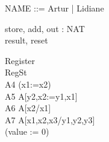 \documentclass{llncs}
\begin{document}
\begin{zed}NAME ::= Artur | Lidiane\end{zed}
\begin{circus}
\circchannel store, add, out : NAT\\
\circchannel result, reset\\
\end{circus}
\begin{circus}
\circprocess Register \circdef\\
\circbegin \circstate RegSt \\
A4 \circdef (x1:=x2)\\
A5 \circdef A[y2,x2:=y1,x1]\\
A6 \circdef A[x2/x1]\\
A7 \circdef A[x1,x2,x3/y1,y2,y3]\\
\circspot (value := 0) \\
\circend\\
\end{circus}
\end{document}
